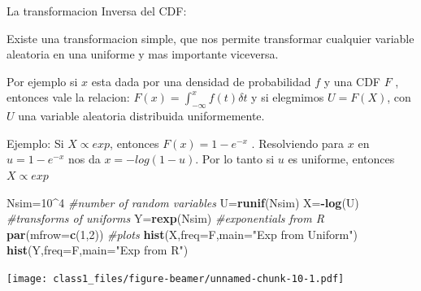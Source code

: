 \documentclass[ignorenonframetext,]{beamer}
\newenvironment{Shaded}{\begin{snugshade}}{\end{snugshade}}
\newcommand{\KeywordTok}[1]{\textcolor[rgb]{0.13,0.29,0.53}{\textbf{#1}}}
\newcommand{\DataTypeTok}[1]{\textcolor[rgb]{0.13,0.29,0.53}{#1}}
\newcommand{\DecValTok}[1]{\textcolor[rgb]{0.00,0.00,0.81}{#1}}
\newcommand{\StringTok}[1]{\textcolor[rgb]{0.31,0.60,0.02}{#1}}
\newcommand{\CommentTok}[1]{\textcolor[rgb]{0.56,0.35,0.01}{\textit{#1}}}
\newcommand{\OperatorTok}[1]{\textcolor[rgb]{0.81,0.36,0.00}{\textbf{#1}}}
\newcommand{\NormalTok}[1]{#1}
\begin{document}
\begin{frame}[fragile]

\begin{block}{La transformacion Inversa del CDF:}

Existe una transformacion simple, que nos permite transformar cualquier
variable aleatoria en una uniforme y mas importante viceversa.

Por ejemplo si \(x\) esta dada por una densidad de probabilidad \(f\) y
una CDF \(F\) , entonces vale la relacion:
\(F(x)=\int_{-\infty}^{x} f(t) \delta t\) y si elegmimos \(U = F (X)\),
con \(U\) una variable aleatoria distribuida uniformemente.

Ejemplo: Si \(X \propto exp\), entonces \(F (x) = 1-e^{-x}\) .
Resolviendo para \(x\) en \(u = 1-e^{-x}\) nos da \(x = -log(1 - u)\).
Por lo tanto si \(u\) es uniforme, entonces \(X \propto exp\)

\begin{Shaded}
\begin{Highlighting}[]
\NormalTok{Nsim=}\DecValTok{10}\OperatorTok{^}\DecValTok{4}
\CommentTok{#number of random variables}
\NormalTok{U=}\KeywordTok{runif}\NormalTok{(Nsim)}
\NormalTok{X=}\OperatorTok{-}\KeywordTok{log}\NormalTok{(U)}
\CommentTok{#transforms of uniforms}
\NormalTok{Y=}\KeywordTok{rexp}\NormalTok{(Nsim)}
\CommentTok{#exponentials from R}
\KeywordTok{par}\NormalTok{(}\DataTypeTok{mfrow=}\KeywordTok{c}\NormalTok{(}\DecValTok{1}\NormalTok{,}\DecValTok{2}\NormalTok{))}
\CommentTok{#plots}
\KeywordTok{hist}\NormalTok{(X,}\DataTypeTok{freq=}\NormalTok{F,}\DataTypeTok{main=}\StringTok{"Exp from Uniform"}\NormalTok{)}
\KeywordTok{hist}\NormalTok{(Y,}\DataTypeTok{freq=}\NormalTok{F,}\DataTypeTok{main=}\StringTok{"Exp from R"}\NormalTok{)}
\end{Highlighting}
\end{Shaded}

\texttt{[image: class1\_files/figure-beamer/unnamed-chunk-10-1.pdf]}

\end{block}

\end{frame}
\end{document}
